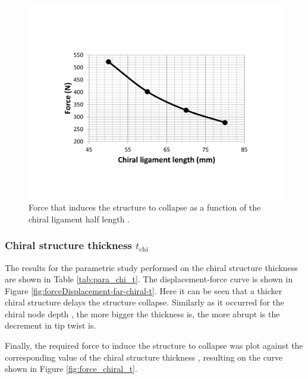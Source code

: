       \begin{figure}[!htpb] %
        \centering
        \includegraphics[width=0.8 \textwidth]{../figures/result-sim/L/force_L}
        \caption[Force that induces the structure to collapse as a function of the chiral ligament half length]{Force that induces the structure to collapse as a function of the chiral ligament half length \chiL.}\label{fig:force_L}
      \end{figure}

    \clearpage
    \subsubsection{Chiral structure thickness $t_{\mathrm{chi}}$}

      The results for the parametric study performed on the chiral structure thickness \chit are shown in Table \ref{tab:para_chi_t}. The displacement-force curve is shown in Figure \ref{fig:forceDisplacement-far-chiral-t}. Here it can be seen that a thicker chiral structure delays the structure collapse. Similarly as it occurred for the chiral node depth \chiB, the more bigger the thickness \chit is, the more abrupt is the decrement in tip twist is.

      Finally, the required force to induce the structure to collapse was plot against the corresponding value of the chiral structure thickness \chit, resulting on the curve shown in Figure \ref{fig:force_chiral_t}.

